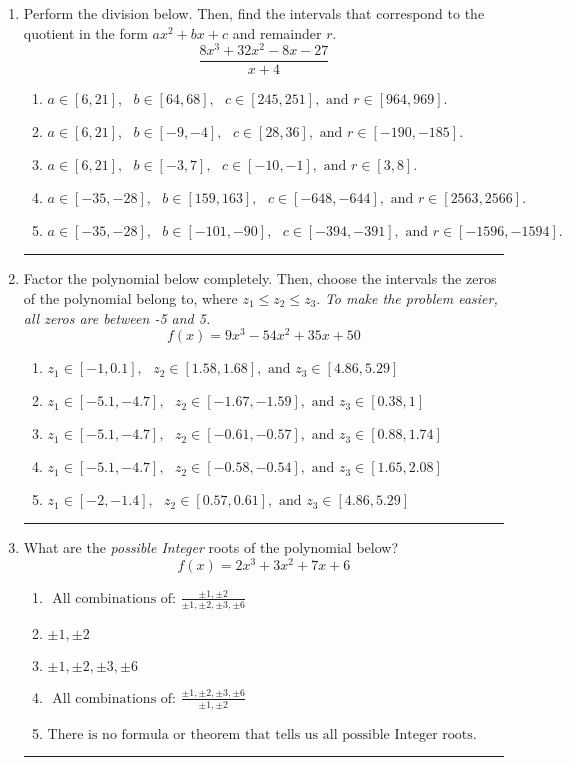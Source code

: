 \documentclass[14pt]{extbook}
\newcommand{\litem}[1]{\item#1\hspace*{-1cm}\rule{\textwidth}{0.4pt}}
\begin{document}
\begin{enumerate}
{\begin{enumerate}[label=\Alph*.]
\end{enumerate} }
\litem{
Perform the division below. Then, find the intervals that correspond to the quotient in the form $ax^2+bx+c$ and remainder $r$.\[ \frac{8x^{3} +32 x^{2} -8 x -27}{x + 4} \]\begin{enumerate}[label=\Alph*.]
\item \( a \in [6, 21], \text{   } b \in [64, 68], \text{   } c \in [245, 251], \text{   and   } r \in [964, 969]. \)
\item \( a \in [6, 21], \text{   } b \in [-9, -4], \text{   } c \in [28, 36], \text{   and   } r \in [-190, -185]. \)
\item \( a \in [6, 21], \text{   } b \in [-3, 7], \text{   } c \in [-10, -1], \text{   and   } r \in [3, 8]. \)
\item \( a \in [-35, -28], \text{   } b \in [159, 163], \text{   } c \in [-648, -644], \text{   and   } r \in [2563, 2566]. \)
\item \( a \in [-35, -28], \text{   } b \in [-101, -90], \text{   } c \in [-394, -391], \text{   and   } r \in [-1596, -1594]. \)

\end{enumerate} }
\litem{
Factor the polynomial below completely. Then, choose the intervals the zeros of the polynomial belong to, where $z_1 \leq z_2 \leq z_3$. \textit{To make the problem easier, all zeros are between -5 and 5.}\[ f(x) = 9x^{3} -54 x^{2} +35 x + 50 \]\begin{enumerate}[label=\Alph*.]
\item \( z_1 \in [-1, 0.1], \text{   }  z_2 \in [1.58, 1.68], \text{   and   } z_3 \in [4.86, 5.29] \)
\item \( z_1 \in [-5.1, -4.7], \text{   }  z_2 \in [-1.67, -1.59], \text{   and   } z_3 \in [0.38, 1] \)
\item \( z_1 \in [-5.1, -4.7], \text{   }  z_2 \in [-0.61, -0.57], \text{   and   } z_3 \in [0.88, 1.74] \)
\item \( z_1 \in [-5.1, -4.7], \text{   }  z_2 \in [-0.58, -0.54], \text{   and   } z_3 \in [1.65, 2.08] \)
\item \( z_1 \in [-2, -1.4], \text{   }  z_2 \in [0.57, 0.61], \text{   and   } z_3 \in [4.86, 5.29] \)

\end{enumerate} }
\litem{
What are the \textit{possible Integer} roots of the polynomial below?\[ f(x) = 2x^{3} +3 x^{2} +7 x + 6 \]\begin{enumerate}[label=\Alph*.]
\item \( \text{ All combinations of: }\frac{\pm 1,\pm 2}{\pm 1,\pm 2,\pm 3,\pm 6} \)
\item \( \pm 1,\pm 2 \)
\item \( \pm 1,\pm 2,\pm 3,\pm 6 \)
\item \( \text{ All combinations of: }\frac{\pm 1,\pm 2,\pm 3,\pm 6}{\pm 1,\pm 2} \)
\item \( \text{There is no formula or theorem that tells us all possible Integer roots.} \)


\end{enumerate}}
\end{enumerate}
\end{document}

